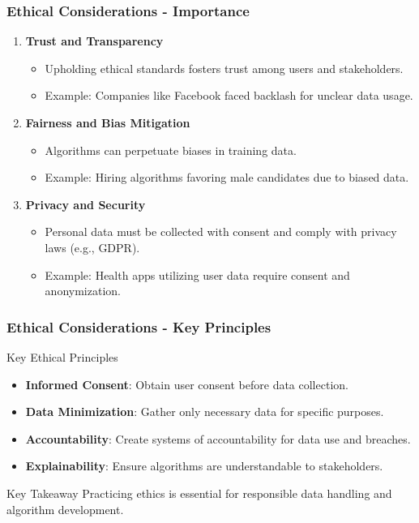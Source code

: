 \documentclass[aspectratio=169]{beamer}
\begin{document}
\begin{frame}[fragile]
    \frametitle{Ethical Considerations - Importance}
    \begin{enumerate}
        \item \textbf{Trust and Transparency}
            \begin{itemize}
                \item Upholding ethical standards fosters trust among users and stakeholders.
                \item Example: Companies like Facebook faced backlash for unclear data usage.
            \end{itemize}
        \item \textbf{Fairness and Bias Mitigation}
            \begin{itemize}
                \item Algorithms can perpetuate biases in training data.
                \item Example: Hiring algorithms favoring male candidates due to biased data.
            \end{itemize}
        \item \textbf{Privacy and Security}
            \begin{itemize}
                \item Personal data must be collected with consent and comply with privacy laws (e.g., GDPR).
                \item Example: Health apps utilizing user data require consent and anonymization.
            \end{itemize}
    \end{enumerate}
\end{frame}

\begin{frame}[fragile]
    \frametitle{Ethical Considerations - Key Principles}
    \begin{block}{Key Ethical Principles}
        \begin{itemize}
            \item \textbf{Informed Consent}: Obtain user consent before data collection.
            \item \textbf{Data Minimization}: Gather only necessary data for specific purposes.
            \item \textbf{Accountability}: Create systems of accountability for data use and breaches.
            \item \textbf{Explainability}: Ensure algorithms are understandable to stakeholders.
        \end{itemize}
    \end{block}
    \begin{block}{Key Takeaway}
        Practicing ethics is essential for responsible data handling and algorithm development.
    \end{block}
\end{frame}
\end{document}
